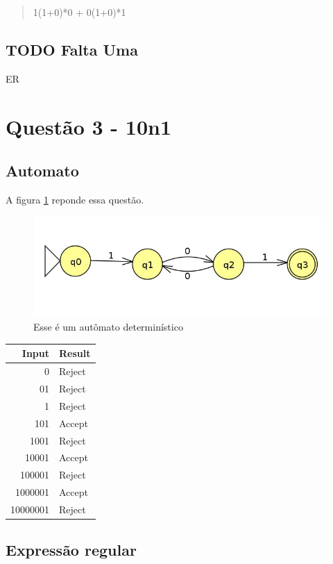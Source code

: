 \documentclass[11pt]{article}
\begin{document}
\begin{quote}
1(1+0)*0 + 0(1+0)*1 
\end{quote}

\subsection{{\bfseries\sffamily TODO} Falta Uma}
\label{sec:org3ecff82}

ER 

\section{Questão 3 - 10n1}
\label{sec:org34f22eb}
\subsection{Automato}
\label{sec:org6c8b5a9}
A figura \ref{fig:org4316aad} reponde essa questão. 

\begin{figure}[htbp]
\centering
\includegraphics[width=.9\linewidth]{./q3/q3.jpg}
\caption{\label{fig:org4316aad}
Esse é um autômato determinístico}
\end{figure}

\begin{center}
\begin{tabular}{rl}
Input & Result\\
\hline
0 & Reject\\
01 & Reject\\
1 & Reject\\
101 & Accept\\
1001 & Reject\\
10001 & Accept\\
100001 & Reject\\
1000001 & Accept\\
10000001 & Reject\\
\end{tabular}
\end{center}
\subsection{Expressão regular}
\label{sec:org9839fb7}
\end{document}
